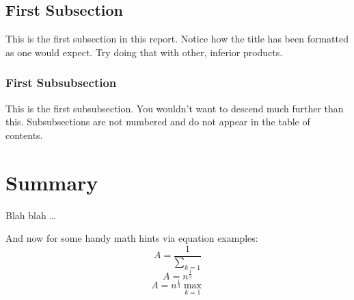 \subsection{First Subsection}

This is the first subsection in this report. Notice how the title has been
formatted as one would expect. Try doing that with other, inferior products.

\subsubsection{First Subsubsection}

This is the first subsubsection. You wouldn't want to descend much further
than this. Subsubsections are not numbered and do not appear in the table of
contents.

\section{Summary}

Blah blah \ldots

And now for some handy math hints via equation examples:
\begin{equation}
A=\frac{1}{\displaystyle\sum_{k=1}^{}}
\end{equation}
\begin{equation}
A=n^{\frac{1}{3}}
\end{equation}
\begin{equation}
A=n^{\frac{1}{3}}\max_{k=1}
\end{equation}

